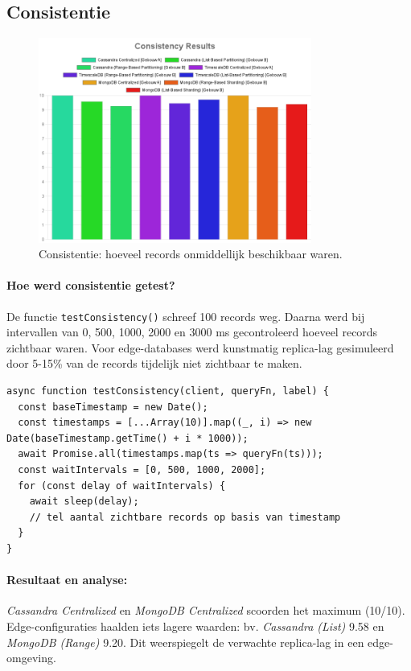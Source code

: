 \subsection{Consistentie}

\begin{figure}[H]
\centering
\includegraphics[width=0.8\textwidth]{charts/Consistency.png}
\caption{Consistentie: hoeveel records onmiddellijk beschikbaar waren.}
\label{fig:consistency-comparison}
\end{figure}

\paragraph{Hoe werd consistentie getest?}
De functie \texttt{testConsistency()} schreef 100 records weg. Daarna werd bij intervallen van 0, 500, 1000, 2000 en 3000 ms gecontroleerd hoeveel records zichtbaar waren.  
Voor edge-databases werd kunstmatig replica-lag gesimuleerd door 5-15\% van de records tijdelijk niet zichtbaar te maken.

\begin{verbatim}
async function testConsistency(client, queryFn, label) {
  const baseTimestamp = new Date();
  const timestamps = [...Array(10)].map((_, i) => new Date(baseTimestamp.getTime() + i * 1000));
  await Promise.all(timestamps.map(ts => queryFn(ts)));
  const waitIntervals = [0, 500, 1000, 2000];
  for (const delay of waitIntervals) {
    await sleep(delay);
    // tel aantal zichtbare records op basis van timestamp
  }
}
\end{verbatim}

\paragraph{Resultaat en analyse:}
\textit{Cassandra Centralized} en \textit{MongoDB Centralized} scoorden het maximum (10/10). Edge-configuraties haalden iets lagere waarden: bv. \textit{Cassandra (List)} 9.58 en \textit{MongoDB (Range)} 9.20. Dit weerspiegelt de verwachte replica-lag in een edge-omgeving.

